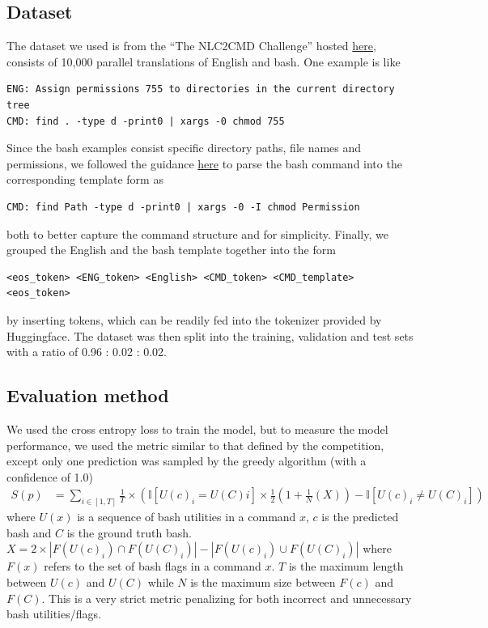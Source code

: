 \subsection{Dataset}
The dataset we used is from the ``The NLC2CMD Challenge'' hosted
\href{https://nlc2cmd.us-east.mybluemix.net/}{here}, consists of 10,000 parallel translations of English and bash. One example is like
\begin{verbatim}
ENG: Assign permissions 755 to directories in the current directory tree
CMD: find . -type d -print0 | xargs -0 chmod 755
\end{verbatim}
Since the bash examples consist specific directory paths, file names and permissions, we followed the guidance \href{https://github.com/IBM/clai/tree/nlc2cmd}{here} to parse the bash command into the corresponding template form as
\begin{verbatim}
CMD: find Path -type d -print0 | xargs -0 -I chmod Permission
\end{verbatim}
both to better capture the command structure and for simplicity. Finally, we grouped the English and the bash template together into the form
\begin{verbatim}
<eos_token> <ENG_token> <English> <CMD_token> <CMD_template> <eos_token> 
\end{verbatim}
by inserting tokens, which can be readily fed into the tokenizer provided by Huggingface. The dataset was then split into the training, validation and test sets with a ratio of 0.96 : 0.02 : 0.02.

\subsection{Evaluation method}
We used the cross entropy loss to train the model, but to measure the model performance, we used the metric similar to that defined by the competition, except only one prediction was sampled by the greedy algorithm (with a confidence of 1.0)
\begin{align*}
	S(p) & =\sum_{i\in[1,T]}\frac{1}{T}\times\left(
		\mathbb{I}[U(c)_i=U(C)i]\times\frac{1}{2}\left(
			1+\frac{1}{N}\left(X\right)\right) -\mathbb{I}[U(c)_i\ne U(C)_i]
		\right)                                                               
\end{align*}
where $U(x)$ is a sequence of bash utilities in a command $x$, $c$ is the predicted bash and $C$ is the ground truth bash. $X = 2\times |F(U(c)_i)\cap F(U(C)_i)| - |F(U(c)_i)\cup F(U(C)_i)|$ where $F(x)$ refers to the set of bash flags in a command $x$. $T$ is the maximum length between $U(c)$ and $U(C)$ while $N$ is the maximum size between $F(c)$ and $F(C)$. This is a very strict metric penalizing for both incorrect and unnecessary bash utilities/flags.
